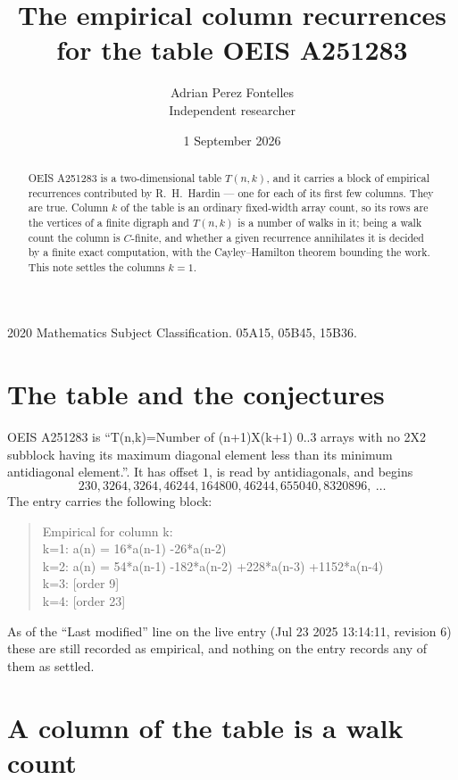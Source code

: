 \documentclass[11pt,a4paper]{article}
\title{The empirical column recurrences for the table OEIS A251283}
\author{Adrian Perez Fontelles\\ \small Independent researcher}
\date{1 September 2026}
\theoremstyle{plain}
\theoremstyle{definition}
\begin{document}
\maketitle

\begin{abstract}
OEIS A251283 is a two-dimensional table $T(n,k)$, and it carries a block of empirical
recurrences contributed by R.~H.~Hardin --- one for each of its first few columns. They are
true. Column $k$ of the table is an ordinary fixed-width array count, so its rows are the
vertices of a finite digraph and $T(n,k)$ is a number of walks in it; being a walk count the
column is $C$-finite, and whether a given recurrence annihilates it is decided by a finite
exact computation, with the Cayley--Hamilton theorem bounding the work. This note settles the columns $k=1$.
\end{abstract}

\noindent\small 2020 Mathematics Subject Classification. 05A15, 05B45, 15B36.\normalsize

\section{The table and the conjectures}

OEIS A251283 is ``T(n,k)=Number of (n+1)X(k+1) 0..3 arrays with no 2X2 subblock having its maximum diagonal element less than its minimum antidiagonal element.''. It has offset $1$, is
read by antidiagonals, and begins
\[
230, 3264, 3264, 46244, 164800, 46244, 655040, 8320896,\ \dots
\]
The entry carries the following block:
\begin{quote}\small
Empirical for column k:\\
k=1: a(n) = 16*a(n-1) -26*a(n-2)\\
k=2: a(n) = 54*a(n-1) -182*a(n-2) +228*a(n-3) +1152*a(n-4)\\
k=3: [order 9]\\
k=4: [order 23]\\
\end{quote}
As of the ``Last modified'' line on the live entry (Jul 23 2025 13:14:11, revision 6) these are still
recorded as empirical, and nothing on the entry records any of them as settled.

\section{A column of the table is a walk count}
\end{document}
